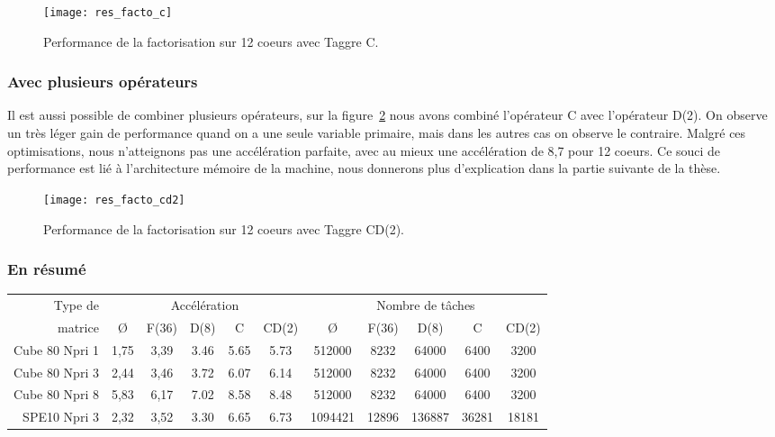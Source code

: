 \begin{figure}[!h]
  \centering
  \texttt{[image: res\_facto\_c]}
  \caption{Performance de la factorisation sur 12 coeurs avec Taggre C.}
  \label{fig:res_facto_c}
\end{figure}


\subsubsection{Avec plusieurs opérateurs}
Il est aussi possible de combiner plusieurs opérateurs, sur la figure~\ref{fig:res_facto_cd2} nous avons combiné l'opérateur C avec l'opérateur D(2).
%
On observe un très léger gain de performance quand on a une seule variable primaire, mais dans les autres cas on observe le contraire.
%
Malgré ces optimisations, nous n'atteignons pas une accélération parfaite, avec au mieux une accélération de 8,7 pour 12 coeurs.
%
Ce souci de performance est lié à l'architecture mémoire de la machine, nous donnerons plus d'explication dans la partie suivante de la thèse.

\begin{figure}[!h]
  \centering
  \texttt{[image: res\_facto\_cd2]}
  \caption{Performance de la factorisation sur 12 coeurs avec Taggre CD(2).}
  \label{fig:res_facto_cd2}
\end{figure}

\subsubsection{En résumé}


\begin{center}
  \begin{tabular}{|r|c|c|c|c|c|c|c|c|c|c|}
    \hline
    Type de  &  \multicolumn{5}{c|}{Accélération}  &  \multicolumn{5}{c|}{Nombre de tâches} \\
    matrice  &  \O & F(36) & D(8) & C & CD(2)  &  \O & F(36) & D(8) & C & CD(2)\\
    \hline
    Cube 80 Npri 1 & 1,75 & 3,39 & 3.46 & 5.65 & 5.73 & 512000  & 8232  & 64000  & 6400  & 3200 \\
    Cube 80 Npri 3 & 2,44 & 3,46 & 3.72 & 6.07 & 6.14 & 512000  & 8232  & 64000  & 6400  & 3200 \\
    Cube 80 Npri 8 & 5,83 & 6,17 & 7.02 & 8.58 & 8.48 & 512000  & 8232  & 64000  & 6400  & 3200 \\
    SPE10 Npri 3   & 2,32 & 3,52 & 3.30 & 6.65 & 6.73 & 1094421 & 12896 & 136887 & 36281 & 18181 \\
    \hline
  \end{tabular}
  \label{tab:facto_res}
\end{center}


